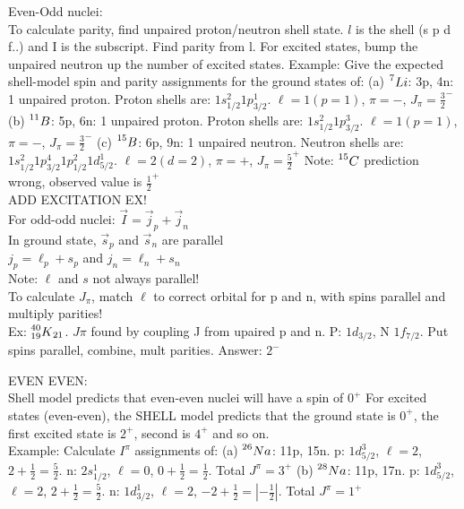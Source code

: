 \documentclass{article}
\begin{document}
\begin{multicols}{3}
Even-Odd nuclei:\\
To calculate parity, find unpaired proton/neutron shell state.  $l$ is the shell (s p d f..) and I is the subscript.  Find parity from l.  For excited states, bump the unpaired neutron up the number of excited states.
\hspace*{0.01\textwidth} Example: Give the expected shell-model spin and parity assignments for the ground states of: (a) $ \prescript{7}{}{Li} $: 3p, 4n: 1 unpaired proton.  Proton shells are: $1s_{1/2}^{2}1p_{3/2}^{1}$.  $\ell = 1 (p=1)$, $\pi = -$, $J_{\pi} = \frac{3}{2}^{-}$ (b) $ \prescript{11}{}{B} $: 5p, 6n: 1 unpaired proton.  Proton shells are: $1s_{1/2}^{2}1p_{3/2}^{3}$.  $\ell = 1 (p=1)$, $\pi = -$, $J_{\pi} = \frac{3}{2}^{-}$ (c) $ \prescript{15}{}{B} $: 6p, 9n: 1 unpaired neutron.  Neutron shells are: $1s_{1/2}^{2}1p_{3/2}^{4}1p_{1/2}^{2}1d_{5/2}^{1}$.  $\ell = 2(d=2)$, $\pi = +$, $J_{\pi} = \frac{5}{2}^{+}$ Note: $\prescript{15}{}{C}$ prediction wrong, observed value is $\frac{1}{2}^{+}$\\
ADD EXCITATION EX!\\

For odd-odd nuclei: $\vec{I} = \vec{j}_{p} + \vec{j}_{n}$\\
In ground state, $\vec{s}_{p}$ and $\vec{s}_{n}$ are parallel\\
$j_{p} = \ell_{p} + s_{p}$ and $j_{n} = \ell_{n} + s_{n}$\\
Note: $\ell$ and $s$ not always parallel!\\
To calculate $J_{\pi}$, match $\ell$ to correct orbital for p and n, with spins parallel and multiply parities!\\
Ex: $\prescript{40}{19}{K}_{21}$.  $J\pi$ found by coupling J from upaired p and n.  P: $1d_{3/2}$, N $1f_{7/2}$.  Put spins parallel, combine, mult parities.  Answer: $2^{-}$


EVEN EVEN:\\
Shell model predicts that even-even nuclei will have a spin of $0^{+}$
For excited states (even-even), the SHELL model predicts that the ground state is $0^{+}$, the first excited state is $2^{+}$, second is $4^{+}$ and so on.\\
\hspace*{0.01\textwidth} Example: Calculate $I^{\pi}$ assignments of: (a) $ \prescript{26}{}{Na} $: 11p, 15n.  p: $1d_{5/2}^{3}$, $\ell = 2$, $2 + \frac{1}{2} = \frac{5}{2}$. n: $2s_{1/2}^{1}$, $\ell = 0$, $0 + \frac{1}{2} = \frac{1}{2	}$.  Total $J^{\pi} = 3^{+}$ (b)  $ \prescript{28}{}{Na} $: 11p, 17n.  p: $1d_{5/2}^{3}$, $\ell = 2$, $2 + \frac{1}{2} = \frac{5}{2}$. n: $1d_{3/2}^{1}$, $\ell = 2$, $-2 + \frac{1}{2} = |-\frac{1}{2}|$.  Total $J^{\pi} = 1^{+}$ \\


\end{multicols}
\end{document}
